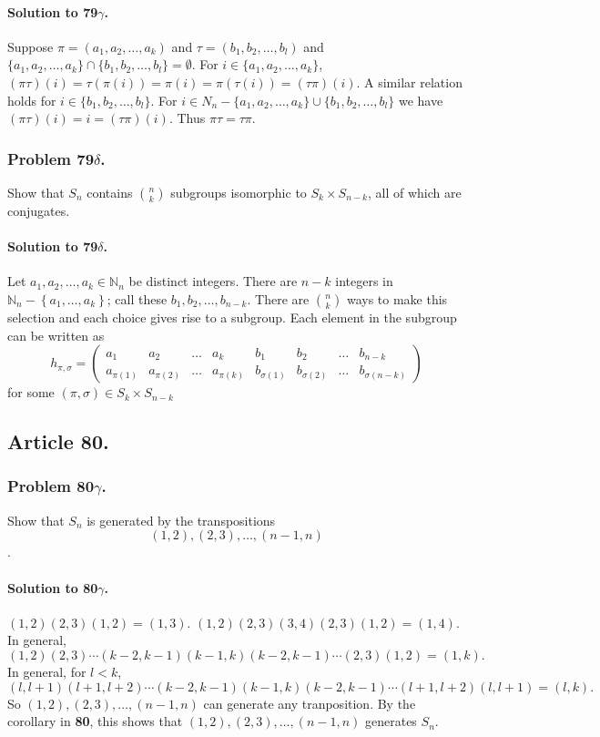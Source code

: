 \paragraph*{Solution to 79$\gamma$.}
Suppose $\pi = (a_1, a_2, \dots, a_k)$ and $\tau = (b_1, b_2, \dots, b_l)$ and
$\{ a_1, a_2, \dots, a_k \} \cap \{ b_1, b_2, \dots, b_l \} = \emptyset$.
For $ i \in \{ a_1, a_2, \dots, a_k \} $, $(\pi \tau)(i) = \tau(\pi (i)) =
\pi(i) = \pi(\tau(i)) = (\tau \pi)(i)$. A similar relation holds for $ i \in
\{ b_1, b_2, \dots, b_l \}$. For $i \in N_n - \{ a_1, a_2, \dots, a_k \} \cup
\{ b_1, b_2, \dots, b_l \}$ we have $(\pi \tau)(i) = i = (\tau \pi)(i)$. Thus
$\pi \tau = \tau \pi$.

\subsubsection{Problem 79$\delta$.}
Show that $S_n$ contains $\binom{n}{k}$
subgroups isomorphic to $S_k \times S_{n-k}$, all of which are conjugates.

\paragraph*{Solution to 79$\delta$.}
Let $a_1, a_2, \dots , a_k \in \mathbb{N}_n$ be distinct integers. There are
$n-k$ integers in $\mathbb{N}_n - \left\{a_1, \dots , a_k\right\}$; call these
$b_1, b_2, \dots , b_{n-k}$. There are $\binom{n}{k}$ ways to make this selection
and each choice gives rise to a subgroup. Each element in the subgroup can be
written as
$$
h_{\pi, \sigma} =
\left(
\begin{array}{cccccccc}
a_1        & a_2        & \dots & a_k        & b_1           & b_2           & \dots & b_{n-k} \\
a_{\pi(1)} & a_{\pi(2)} & \dots & a_{\pi(k)} & b_{\sigma(1)} & b_{\sigma(2)} & \dots & b_{\sigma(n-k)}
\end{array}
\right)
$$
for some $(\pi, \sigma) \in S_k \times S_{n-k}$

\subsection{Article 80.}
\subsubsection{Problem 80$\gamma$.}
Show that $S_n$ is generated by the transpositions $$(1,2), (2,3), \dots, (n-1,n)$$.

\paragraph*{Solution to 80$\gamma$.}
$(1,2)(2,3)(1,2) = (1,3)$.
$(1,2)(2,3)(3,4)(2,3)(1,2) = (1,4)$.
In general, $$(1,2)(2,3) \cdots (k-2,k-1)(k-1,k)(k-2,k-1) \cdots (2,3)(1,2) = (1,k).$$
In general, for $l < k$,
$$(l,l+1)(l+1,l+2) \cdots (k-2,k-1)(k-1,k)(k-2,k-1) \cdots (l+1,l+2)(l,l+1) = (l,k).$$
So $(1,2), (2,3), \dots, (n-1,n)$ can generate any tranposition. By the corollary
in \textbf{80}, this shows that $(1,2), (2,3), \dots, (n-1,n)$ generates $S_n$.

